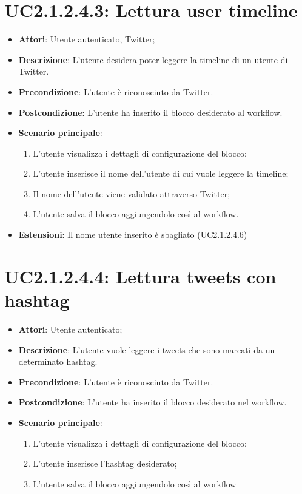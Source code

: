 \section{UC2.1.2.4.3: Lettura user timeline}
\label{UC2.1.2.4.3}
\begin{itemize}
	\item \textbf{Attori}: Utente autenticato, Twitter;
	\item \textbf{Descrizione}: L'utente desidera poter leggere la timeline di un utente di Twitter.
	\item \textbf{Precondizione}: L'utente è riconosciuto da Twitter.
	\item \textbf{Postcondizione}: L'utente ha inserito il blocco desiderato al workflow.
	\item \textbf{Scenario principale}:
	\begin{enumerate}\item L'utente visualizza i dettagli di configurazione del blocco;  \item L'utente inserisce il nome dell'utente di cui vuole leggere la timeline;  \item  Il nome dell'utente viene validato attraverso Twitter;  \item L'utente salva il blocco aggiungendolo così al workflow.\end{enumerate}
	\item \textbf{Estensioni}:
	Il nome utente inserito è sbagliato (UC2.1.2.4.6)
\end{itemize}

\section{UC2.1.2.4.4: Lettura tweets con hashtag}
\label{UC2.1.2.4.4}
\begin{itemize}
	\item \textbf{Attori}: Utente autenticato;
	\item \textbf{Descrizione}: L'utente vuole leggere i tweets che sono marcati da un determinato hashtag.
	\item \textbf{Precondizione}: L'utente è riconosciuto da Twitter.
	\item \textbf{Postcondizione}: L'utente ha inserito il blocco desiderato nel workflow.
	\item \textbf{Scenario principale}:
	\begin{enumerate} \item L'utente visualizza i dettagli di configurazione del blocco; \item L'utente inserisce l'hashtag desiderato;  \item  L'utente salva il blocco aggiungendolo così al workflow\end{enumerate}
\end{itemize}

